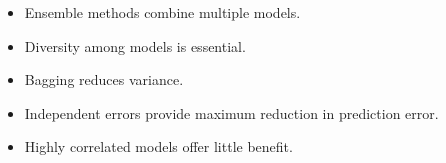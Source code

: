\documentclass[11pt]{article}
\begin{document}
\begin{itemize}
	\item Ensemble methods combine multiple models.
	\item Diversity among models is essential.
	\item Bagging reduces variance.
	\item Independent errors provide maximum reduction in prediction error.
	\item Highly correlated models offer little benefit.
\end{itemize}



\end{document}
